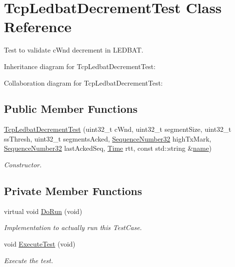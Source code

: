 \hypertarget{classTcpLedbatDecrementTest}{}\section{Tcp\+Ledbat\+Decrement\+Test Class Reference}
\label{classTcpLedbatDecrementTest}


Test to validate c\+Wnd decrement in L\+E\+D\+B\+AT.  




Inheritance diagram for Tcp\+Ledbat\+Decrement\+Test\+:


Collaboration diagram for Tcp\+Ledbat\+Decrement\+Test\+:
\subsection*{Public Member Functions}
\begin{DoxyCompactItemize}
\item 
\hyperlink{classTcpLedbatDecrementTest_a1966f311d03665c61135a719efebf2c9}{Tcp\+Ledbat\+Decrement\+Test} (uint32\+\_\+t c\+Wnd, uint32\+\_\+t segment\+Size, uint32\+\_\+t ss\+Thresh, uint32\+\_\+t segments\+Acked, \hyperlink{group__network_gacb2070e4e98d2d5135c9bede58f07a03}{Sequence\+Number32} high\+Tx\+Mark, \hyperlink{group__network_gacb2070e4e98d2d5135c9bede58f07a03}{Sequence\+Number32} last\+Acked\+Seq, \hyperlink{classns3_1_1Time}{Time} rtt, const std\+::string \&\hyperlink{generate__test__data__lte__spectrum__model_8m_ab74e6bf80237ddc4109968cedc58c151}{name})
\begin{DoxyCompactList}\small\item\em Constructor. \end{DoxyCompactList}\end{DoxyCompactItemize}
\subsection*{Private Member Functions}
\begin{DoxyCompactItemize}
\item 
virtual void \hyperlink{classTcpLedbatDecrementTest_a33081c7ce4c6639ba598e79cf2d7e19f}{Do\+Run} (void)
\begin{DoxyCompactList}\small\item\em Implementation to actually run this Test\+Case. \end{DoxyCompactList}\item 
void \hyperlink{classTcpLedbatDecrementTest_a6c33fcfc3f71942ffc0b987f8d685f8d}{Execute\+Test} (void)
\begin{DoxyCompactList}\small\item\em Execute the test. \end{DoxyCompactList}\end{DoxyCompactItemize}
